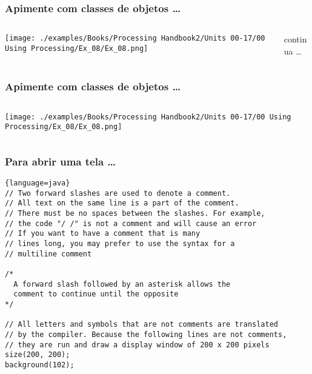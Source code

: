 \documentclass{beamer}
\begin{document}
\begin{frame}[fragile]
\frametitle{Apimente com classes de objetos  \dots}
  \begin{columns}[T]
    \begin{column}{.4\textwidth}
    \texttt{[image: ./examples/Books/Processing Handbook2/Units 00-17/00 Using Processing/Ex\_08/Ex\_08.png]}
    \end{column}
    \begin{column}{.6\textwidth}
      
   continua \dots
    \end{column}
  \end{columns}
\end{frame}

\begin{frame}[fragile]
\frametitle{Apimente com classes de objetos  \dots}
  \begin{columns}[T]
    \begin{column}{.4\textwidth}
    \texttt{[image: ./examples/Books/Processing Handbook2/Units 00-17/00 Using Processing/Ex\_08/Ex\_08.png]}
    \end{column}
    \begin{column}{.6\textwidth}
      
   \end{column}
  \end{columns}
\end{frame}

\begin{frame}[fragile]
\frametitle{Para abrir uma tela \dots}
\begin{lstlisting}{language=java}
// Two forward slashes are used to denote a comment.
// All text on the same line is a part of the comment.
// There must be no spaces between the slashes. For example,
// the code "/ /" is not a comment and will cause an error
// If you want to have a comment that is many
// lines long, you may prefer to use the syntax for a
// multiline comment

/* 
  A forward slash followed by an asterisk allows the 
  comment to continue until the opposite 
*/ 
 
// All letters and symbols that are not comments are translated 
// by the compiler. Because the following lines are not comments, 
// they are run and draw a display window of 200 x 200 pixels 
size(200, 200); 
background(102);   
\end{lstlisting}
\end{frame}
\end{document}
